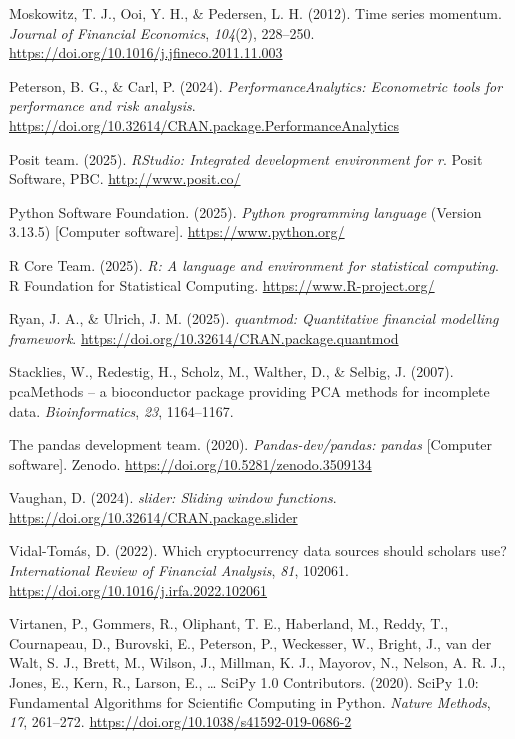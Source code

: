 \documentclass[
  12pt,
  a4paper,
  openany]{scrbook}
\newlength{\cslhangindent}
\newenvironment{CSLReferences}[2] %
 {\begin{list}{}{%
  \setlength{\itemindent}{0pt}
  \setlength{\leftmargin}{0pt}
  \setlength{\parsep}{0pt}
  \ifodd #1
   \setlength{\leftmargin}{\cslhangindent}
   \setlength{\itemindent}{-1\cslhangindent}
  \fi
  \setlength{\itemsep}{#2\baselineskip}}}
 {\end{list}}
\begin{document}
\begin{CSLReferences}{1}{0}
Moskowitz, T. J., Ooi, Y. H., \& Pedersen, L. H. (2012). Time series
momentum. \emph{Journal of Financial Economics}, \emph{104}(2),
228--250. \url{https://doi.org/10.1016/j.jfineco.2011.11.003}

Peterson, B. G., \& Carl, P. (2024). \emph{{PerformanceAnalytics}:
Econometric tools for performance and risk analysis}.
\url{https://doi.org/10.32614/CRAN.package.PerformanceAnalytics}

Posit team. (2025). \emph{{RStudio}: Integrated development environment
for r}. Posit Software, PBC. \url{http://www.posit.co/}

Python Software Foundation. (2025). \emph{Python programming language}
(Version 3.13.5) {[}Computer software{]}. \url{https://www.python.org/}

R Core Team. (2025). \emph{R: A language and environment for statistical
computing}. R Foundation for Statistical Computing.
\url{https://www.R-project.org/}

Ryan, J. A., \& Ulrich, J. M. (2025). \emph{{quantmod}: Quantitative
financial modelling framework}.
\url{https://doi.org/10.32614/CRAN.package.quantmod}

Stacklies, W., Redestig, H., Scholz, M., Walther, D., \& Selbig, J.
(2007). pcaMethods -- a bioconductor package providing PCA methods for
incomplete data. \emph{Bioinformatics}, \emph{23}, 1164--1167.

The pandas development team. (2020). \emph{Pandas-dev/pandas: pandas}
{[}Computer software{]}. Zenodo.
\url{https://doi.org/10.5281/zenodo.3509134}

Vaughan, D. (2024). \emph{{slider}: Sliding window functions}.
\url{https://doi.org/10.32614/CRAN.package.slider}

Vidal-Tomás, D. (2022). Which cryptocurrency data sources should
scholars use? \emph{International Review of Financial Analysis},
\emph{81}, 102061. \url{https://doi.org/10.1016/j.irfa.2022.102061}

Virtanen, P., Gommers, R., Oliphant, T. E., Haberland, M., Reddy, T.,
Cournapeau, D., Burovski, E., Peterson, P., Weckesser, W., Bright, J.,
van der Walt, S. J., Brett, M., Wilson, J., Millman, K. J., Mayorov, N.,
Nelson, A. R. J., Jones, E., Kern, R., Larson, E., \ldots{} SciPy 1.0
Contributors. (2020). {{SciPy} 1.0: Fundamental Algorithms for
Scientific Computing in Python}. \emph{Nature Methods}, \emph{17},
261--272. \url{https://doi.org/10.1038/s41592-019-0686-2}


\end{CSLReferences}
\end{document}
